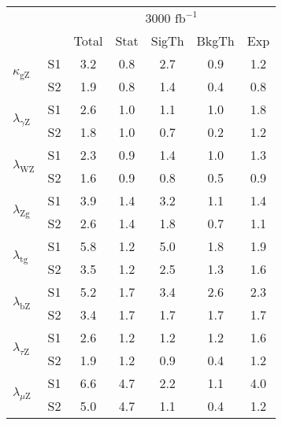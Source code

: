 \begin{tabular}{@{} l c c@{\hskip 0.15in} c c c c @{}}
 \hline
  &  & \multicolumn{5}{c}{3000 $\text{fb}^{-1}$} \\
  &  & Total & Stat & SigTh & BkgTh & Exp \\
 \hline
\multirow{2}{*}{$\kappa_{\mathrm{gZ}}$} & S1  & 3.2& 0.8 & 2.7 & 0.9 & 1.2  \\[1pt]
                        & S2  & 1.9& 0.8 & 1.4 & 0.4 & 0.8  \\[4pt]
\multirow{2}{*}{$\lambda_{\gamma\mathrm{Z}}$} & S1  & 2.6& 1.0 & 1.1 & 1.0 & 1.8  \\[1pt]
                        & S2  & 1.8& 1.0 & 0.7 & 0.2 & 1.2  \\[4pt]
\multirow{2}{*}{$\lambda_{\mathrm{WZ}}$} & S1  & 2.3& 0.9 & 1.4 & 1.0 & 1.3  \\[1pt]
                        & S2  & 1.6& 0.9 & 0.8 & 0.5 & 0.9  \\[4pt]
\multirow{2}{*}{$\lambda_{\mathrm{Zg}}$} & S1  & 3.9& 1.4 & 3.2 & 1.1 & 1.4  \\[1pt]
                        & S2  & 2.6& 1.4 & 1.8 & 0.7 & 1.1  \\[4pt]
\multirow{2}{*}{$\lambda_{\mathrm{tg}}$} & S1  & 5.8& 1.2 & 5.0 & 1.8 & 1.9  \\[1pt]
                        & S2  & 3.5& 1.2 & 2.5 & 1.3 & 1.6  \\[4pt]
\multirow{2}{*}{$\lambda_{\mathrm{bZ}}$} & S1  & 5.2& 1.7 & 3.4 & 2.6 & 2.3  \\[1pt]
                        & S2  & 3.4& 1.7 & 1.7 & 1.7 & 1.7  \\[4pt]
\multirow{2}{*}{$\lambda_{\tau\mathrm{Z}}$} & S1  & 2.6& 1.2 & 1.2 & 1.2 & 1.6  \\[1pt]
                        & S2  & 1.9& 1.2 & 0.9 & 0.4 & 1.2  \\[4pt]
\multirow{2}{*}{$\lambda_{\mu\mathrm{Z}}$} & S1  & 6.6& 4.7 & 2.2 & 1.1 & 4.0  \\[1pt]
                        & S2  & 5.0& 4.7 & 1.1 & 0.4 & 1.2  \\[4pt]
\hline
\end{tabular}